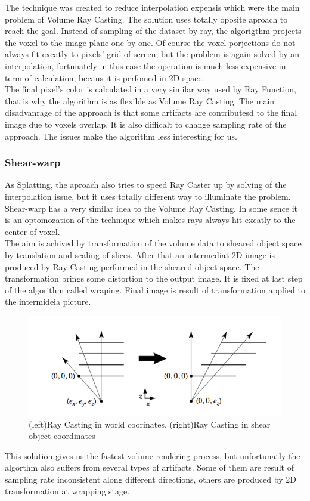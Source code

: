 \documentclass[twoside, english, 11pt]{report}
\begin{document}
The technique was created to reduce interpolation expensis which were the main problem of Volume Ray Casting. The solution uses totally oposite aproach to reach the goal. Instead of sampling of the dataset by ray, the algorigthm projects the voxel to the image plane one by one. Of course the voxel porjections do not always fit excatly to pixels' grid of screen, but the problem is again solved by an interpolation, fortunately in this case the operation is much less expensive in term of calculation, becaus it is perfomed in 2D space. \\

The final pixel's color is calculated in a very similar way used by Ray Function, that is why the algorithm is as flexible as Volume Ray Casting. The main disadvanrage of the approach is that some artifacts are contributesd to the final image due to voxels overlap. It is also difficalt to change sampling rate of the approach. The issues make the algorithm less interesting for us.

\subsubsection{Shear-warp}

As Splatting, the aproach also tries to speed Ray Caster up by solving of the interpolation issue, but it uses totally different way to illuminate the problem. Shear-warp has a very similar idea to the Volume Ray Casting. In some sence it is an optomozation of the technique which makes rays always hit excatly to the center of voxel.\\

The aim is achived by transformation of the volume data to sheared object space by translation and scaling of slices. After that an intermediat 2D image is produced by Ray Casting performed in the sheared object space. The transformation brings some distortion to the output image. It is fixed at last step of the algorithm called wraping. Final image is result of transformation applied to the intermideia picture.\\
\begin{figure}[!h]
\centerline{\includegraphics[scale=0.5]{img/shear-warp}}
\caption{(left)Ray Casting in world coorinates, (right)Ray Casting in shear object coordinates}
\end{figure}
This solution gives us the fastest volume rendering process, but unfortunatly the algorthm also suffers from several types of artifacts. Some of them are result of sampling rate inconsistent along different directions, others are produced by 2D transformation at wrapping stage.
\end{document}
